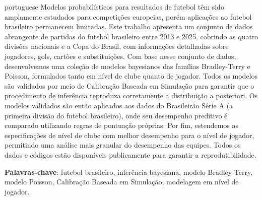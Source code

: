 \begin{resumo}[Resumo]
    \begin{otherlanguage*}{portuguese}
        Modelos probabilísticos para resultados de futebol têm sido amplamente estudados para competições europeias, porém aplicações ao futebol brasileiro permanecem limitadas.
        Este trabalho apresenta um conjunto de dados abrangente de partidas do futebol brasileiro entre 2013 e 2025, cobrindo as quatro divisões nacionais e a Copa do Brasil, com informações detalhadas sobre jogadores, gols, cartões e substituições.
        Com base nesse conjunto de dados, desenvolvemos uma coleção de modelos bayesianos das famílias Bradley-Terry e Poisson, formulados tanto em nível de clube quanto de jogador.
        Todos os modelos são validados por meio de Calibração Baseada em Simulação para garantir que o procedimento de inferência reproduza corretamente a distribuição a posteriori.
        Os modelos validados são então aplicados aos dados do Brasileirão Série A (a primeira divisão do futebol brasileiro), onde seu desempenho preditivo é comparado utilizando regras de pontuação próprias.
        Por fim, estendemos as especificações de nível de clube com melhor desempenho para o nível de jogador, permitindo uma análise mais granular do desempenho das equipes.
        Todos os dados e códigos estão disponíveis publicamente para garantir a reprodutibilidade.

        \vspace{\onelineskip}

        \noindent
        \textbf{Palavras-chave}: futebol brasileiro, inferência bayesiana, modelo Bradley-Terry, modelo Poisson, Calibração Baseada em Simulação, modelagem em nível de jogador.
    \end{otherlanguage*}
\end{resumo}
